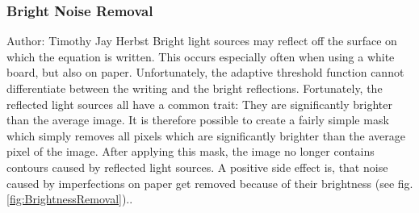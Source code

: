 \documentclass[11pt]{article}
\begin{document}
	\subsubsection{Bright Noise Removal}
	\small{Author: Timothy Jay Herbst} \newline \newline
	Bright light sources may reflect off the surface on which the equation is written.
	This occurs especially often when using a white board, but also on paper.
	Unfortunately, the adaptive threshold function cannot differentiate between the writing and the bright reflections.
	Fortunately, the reflected light sources all have a common trait:
	They are significantly brighter than the average image.
	It is therefore possible to create a fairly simple mask which simply removes all pixels which are significantly brighter than the average pixel of the image.
	After applying this mask, the image no longer contains contours caused by reflected light sources. %
	A positive side effect is, that noise caused by imperfections on paper get removed because of their brightness (see fig. \ref{fig:BrightnessRemoval})..
	
\end{document}
